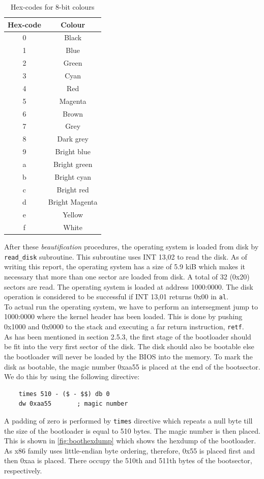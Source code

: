 \begin{table}
\begin{center}
{\normalsize%
\caption{Hex-codes for 8-bit colours}\label{table:8bitcolour}
\begin{tabular}[t]{|c|c|}
\hline
\textbf{Hex-code} & \textbf{Colour}\\
\hline
0 & Black\\
\hline
1 & Blue\\
\hline
2 & Green\\
\hline
3 & Cyan\\
\hline
4 & Red\\
\hline
5 & Magenta\\
\hline
6 & Brown\\
\hline
7 & Grey\\
\hline
8 & Dark grey\\
\hline
9 & Bright blue\\
\hline
a & Bright green\\
\hline
b & Bright cyan\\
\hline
c & Bright red\\
\hline
d & Bright Magenta\\
\hline
e & Yellow\\
\hline
f & White\\
\hline
\end{tabular}}
\end{center}
\end{table}

After these \textit{beautification} procedures, the operating system is loaded from disk by \texttt{read\_disk} subroutine. This subroutine uses INT 13,02 to read the disk. As of writing this report, the operating system has a size of 5.9 kiB which makes it necessary that more than one sector are loaded from disk. A total of 32 (0x20) sectors are read. The operating system is loaded at address 1000:0000. The disk operation is considered to be successful if INT 13,01 returns 0x00 in \verb|al|.\\
To actual run the operating system, we have to perform an intersegment jump to 1000:0000 where the kernel header has been loaded. This is done by pushing 0x1000 and 0x0000 to the stack and executing a far return instruction, \verb|retf|.\\
As has been mentioned in section 2.5.3, the first stage of the bootloader should be fit into the very first sector of the disk. The disk should also be bootable else the bootloader will never be loaded by the BIOS into the memory. To mark the disk as bootable, the magic number 0xaa55 is placed at the end of the bootsector. We do this by using the following directive:
\begin{Verbatim}
	times 510 - ($ - $$) db 0	
	dw 0xaa55		; magic number
\end{Verbatim}
A padding of zero is performed by \texttt{times} directive which repeats a null byte till the size of the bootloader is equal to 510 bytes. The magic number is then placed. This is shown in \autoref{fig:boothexdump} which shows the hexdump of the bootloader. As x86 family uses little-endian byte ordering, therefore, 0x55 is placed first and then 0xaa is placed. There occupy the 510th and 511th bytes of the bootsector, respectively.

